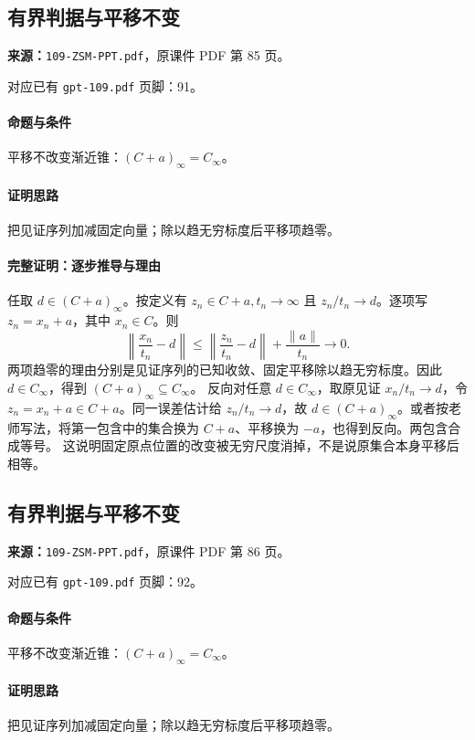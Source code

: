 \clearpage\subsection{有界判据与平移不变}
\textbf{来源：}\texttt{109-ZSM-PPT.pdf}，原课件 PDF 第 85 页。\par
对应已有 \texttt{gpt-109.pdf} 页脚：91。\par
\paragraph{命题与条件}平移不改变渐近锥：$(C+a)_\infty=C_\infty$。
\paragraph{证明思路}把见证序列加减固定向量；除以趋无穷标度后平移项趋零。
\paragraph{完整证明：逐步推导与理由}

任取 $d\in(C+a)_\infty$。按定义有 $z_n\in C+a,t_n\to\infty$ 且 $z_n/t_n\to d$。逐项写 $z_n=x_n+a$，其中 $x_n\in C$。则
\[\left\|\frac{x_n}{t_n}-d\right\|\le\left\|\frac{z_n}{t_n}-d\right\|+\frac{\|a\|}{t_n}\to0.\]
两项趋零的理由分别是见证序列的已知收敛、固定平移除以趋无穷标度。因此 $d\in C_\infty$，得到 $(C+a)_\infty\subseteq C_\infty$。
反向对任意 $d\in C_\infty$，取原见证 $x_n/t_n\to d$，令 $z_n=x_n+a\in C+a$。同一误差估计给 $z_n/t_n\to d$，故 $d\in(C+a)_\infty$。或者按老师写法，将第一包含中的集合换为 $C+a$、平移换为 $-a$，也得到反向。两包含合成等号。
这说明固定原点位置的改变被无穷尺度消掉，不是说原集合本身平移后相等。

\clearpage\subsection{有界判据与平移不变}
\textbf{来源：}\texttt{109-ZSM-PPT.pdf}，原课件 PDF 第 86 页。\par
对应已有 \texttt{gpt-109.pdf} 页脚：92。\par
\paragraph{命题与条件}平移不改变渐近锥：$(C+a)_\infty=C_\infty$。
\paragraph{证明思路}把见证序列加减固定向量；除以趋无穷标度后平移项趋零。

